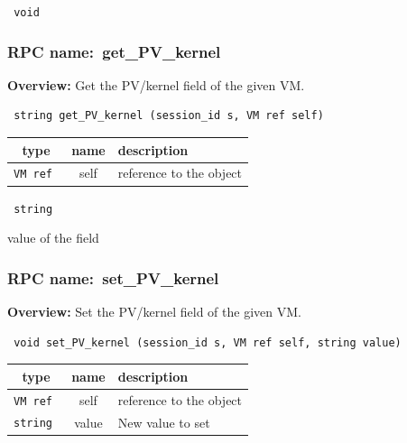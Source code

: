 \vspace{0.3cm}

{\tt 
void
}



\vspace{0.3cm}
\vspace{0.3cm}
\vspace{0.3cm}
\subsubsection{RPC name:~get\_PV\_kernel}

{\bf Overview:} 
Get the PV/kernel field of the given VM.

\begin{verbatim} string get_PV_kernel (session_id s, VM ref self)\end{verbatim}



 
\vspace{0.3cm}
\begin{tabular}{|c|c|p{7cm}|}
 \hline
{\bf type} & {\bf name} & {\bf description} \\ \hline
{\tt VM ref } & self & reference to the object \\ \hline 

\end{tabular}

\vspace{0.3cm}

{\tt 
string
}


value of the field
\vspace{0.3cm}
\vspace{0.3cm}
\vspace{0.3cm}
\subsubsection{RPC name:~set\_PV\_kernel}

{\bf Overview:} 
Set the PV/kernel field of the given VM.

\begin{verbatim} void set_PV_kernel (session_id s, VM ref self, string value)\end{verbatim}



 
\vspace{0.3cm}
\begin{tabular}{|c|c|p{7cm}|}
 \hline
{\bf type} & {\bf name} & {\bf description} \\ \hline
{\tt VM ref } & self & reference to the object \\ \hline 

{\tt string } & value & New value to set \\ \hline 

\end{tabular}

